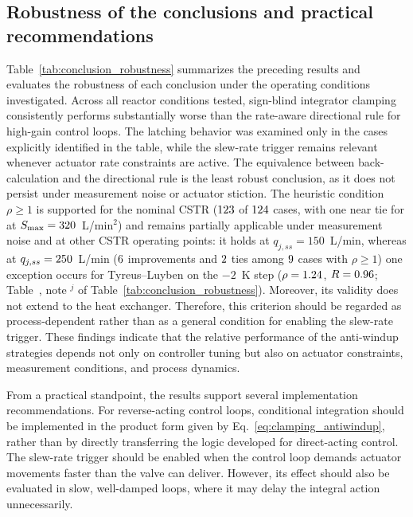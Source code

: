 \subsection{Robustness of the conclusions and practical recommendations}
\label{subsec:robustness_summary}
Table~\ref{tab:conclusion_robustness} summarizes the preceding results and evaluates the robustness of each conclusion under the operating conditions investigated. Across all reactor conditions tested, sign-blind integrator clamping consistently performs substantially worse than the rate-aware directional rule for high-gain control loops. The latching behavior was examined only in the cases explicitly identified in the table, while the slew-rate trigger remains relevant whenever actuator rate constraints are active. The equivalence between back-calculation and the directional rule is the least robust conclusion, as it does not persist under measurement noise or actuator stiction. The heuristic condition $\rho \ge 1$ is supported for the nominal CSTR ($123$ of $124$ cases, with one near tie for \vrhoexcloop{} at $S_{\max} = 320$~L/min$^2$) and remains partially applicable under measurement noise and at other CSTR operating points: it holds at $q_{j,ss} = 150$~L/min, whereas at $q_{j,ss} = 250$~L/min ($6$ improvements and $2$ ties among $9$ cases with $\rho \ge 1$) one exception occurs for Tyreus--Luyben on the $-2$~K step ($\rho = 1.24$, $R = 0.96$; Table~, note $^j$ of Table~\ref{tab:conclusion_robustness}). Moreover, its validity does not extend to the heat exchanger. Therefore, this criterion should be regarded as process-dependent rather than as a general condition for enabling the slew-rate trigger. These findings indicate that the relative performance of the anti-windup strategies depends not only on controller tuning but also on actuator constraints, measurement conditions, and process dynamics.

From a practical standpoint, the results support several implementation recommendations. For reverse-acting control loops, conditional integration should be implemented in the product form given by Eq.~\eqref{eq:clamping_antiwindup}, rather than by directly transferring the logic developed for direct-acting control. The slew-rate trigger should be enabled when the control loop demands actuator movements faster than the valve can deliver. However, its effect should also be evaluated in slow, well-damped loops, where it may delay the integral action unnecessarily.

